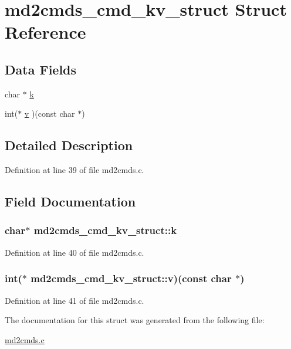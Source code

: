 \hypertarget{structmd2cmds__cmd__kv__struct}{\section{md2cmds\-\_\-cmd\-\_\-kv\-\_\-struct Struct Reference}
\label{structmd2cmds__cmd__kv__struct}
}
\subsection*{Data Fields}
\begin{DoxyCompactItemize}
\item 
char $\ast$ \hyperlink{structmd2cmds__cmd__kv__struct_a4cd5cce8339ed8cc9f0a5835a9bc5c69}{k}
\item 
int($\ast$ \hyperlink{structmd2cmds__cmd__kv__struct_ab12171e8ea4148dedcb13673e05ca92c}{v} )(const char $\ast$)
\end{DoxyCompactItemize}


\subsection{Detailed Description}


Definition at line 39 of file md2cmds.\-c.



\subsection{Field Documentation}
\hypertarget{structmd2cmds__cmd__kv__struct_a4cd5cce8339ed8cc9f0a5835a9bc5c69}{
\subsubsection[{k}]{\setlength{\rightskip}{0pt plus 5cm}char$\ast$ md2cmds\-\_\-cmd\-\_\-kv\-\_\-struct\-::k}}\label{structmd2cmds__cmd__kv__struct_a4cd5cce8339ed8cc9f0a5835a9bc5c69}


Definition at line 40 of file md2cmds.\-c.

\hypertarget{structmd2cmds__cmd__kv__struct_ab12171e8ea4148dedcb13673e05ca92c}{
\subsubsection[{v}]{\setlength{\rightskip}{0pt plus 5cm}int($\ast$ md2cmds\-\_\-cmd\-\_\-kv\-\_\-struct\-::v)(const char $\ast$)}}\label{structmd2cmds__cmd__kv__struct_ab12171e8ea4148dedcb13673e05ca92c}


Definition at line 41 of file md2cmds.\-c.



The documentation for this struct was generated from the following file\-:\begin{DoxyCompactItemize}
\item 
\hyperlink{md2cmds_8c}{md2cmds.\-c}\end{DoxyCompactItemize}
